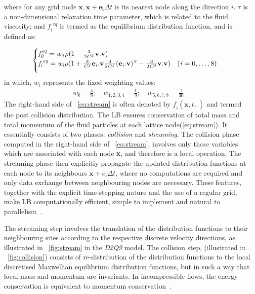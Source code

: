 where for any grid node $\mathbf{x},\mathbf{x}+\mathbf{e_i} \Delta t$ is its 
nearest node along the direction $\mathit{i}$. $\tau$ is a non-dimensional 
relaxation time parameter, which is related to the fluid viscosity; and 
$\mathit{f_i}^{\mathit{eq}}$ is termed as the equilibrium distribution 
function, and is defined as:

\begin{align}
\begin{cases}
\mathit{f}_{\mathit{0}}^{\mathit{eq}}=\mathit{w}_{\mathit{0}} \rho (1 - 
\frac{3}{2\mathit{C}^{\mathit{2}}}\mathbf{v}.\mathbf{v}) \\ 
\vspace*{2mm}
\mathit{f_i}^{\mathit{eq}}=\mathit{w_i} \rho (1 + 
\frac{3}{\mathit{C}^{\mathit{2}}}\mathbf{e}_{\mathit{i}}.\mathbf{v} 
\frac{9}{2\mathit{C}^{\mathit{2}}} 
(\mathbf{e}_{\mathit{i}}.\mathbf{v})^{\mathit{2}}-\frac{3}{2 
\mathit{C}^{\mathit{2}}}\mathbf{v}.\mathbf{v}) \quad (\mathit{i}=0,\dots,8)
\end{cases}
\end{align}
in which, $\mathit{w_i}$ represents the fixed weighting values:
\begin{align}
\mathit{w}_{\mathit{0}} = \frac{4}{9}; \quad \mathit{w}_{\mathit{1,2,3,4}}= 
\frac{1}{9}; \quad \mathit{w}_{\mathit{5,6,7,8}}= \frac{1}{36}
\end{align}
The right-hand side of ~\cref{eq:stream} is often denoted by 
$\mathit{f_i}(\mathbf{x}, \mathit{t}_{+})$ and termed the post collision 
distribution. The LB ensures conservation of total mass and total momentum of 
the fluid particles at each lattice node(\cref{eq:stream}). It essentially 
consists of two phases: \textit{collision} and \textit{streaming}. The 
collision phase computed in the right-hand side of ~\cref{eq:stream}, involves 
only those variables which are associated with each node \textbf{x}, and 
therefore is a local operation. The streaming phase then explicitly propagate 
the updated distribution functions at each node to its neighbours 
$\mathbf{x}+\mathbf{\mathit{e}_i} \Delta t$, where no computations are required 
and only data exchange between neighbouring nodes are necessary. These 
features, together with the explicit time-stepping nature and the use of a 
regular grid, make LB computationally efficient, simple to implement and 
natural to parallelism~\citep{Han2007}. 

The streaming step involves the translation of the distribution functions to 
their neighbouring sites according to the respective discrete velocity 
directions, as illustrated in ~\cref{fig:stream} in the \textit{D2Q9} model. 
The collision step, (illustrated in ~\cref{fig:collision}) consists of 
re-distribution of the distribution functions to the local discretised 
Maxwellian equilibrium distribution functions, but in such a way that local 
mass and momentum are invariants. In incompressible flows, the energy 
conservation is equivalent to momentum conservation~\citep{He1997}.

